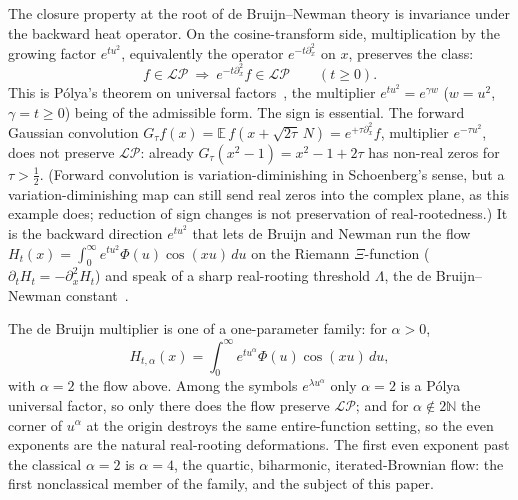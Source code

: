 \documentclass[11pt,reqno]{amsart}
\theoremstyle{plain}
\theoremstyle{definition}
\theoremstyle{remark}
\newcommand{\N}{\mathbb N}
\newcommand{\E}{\mathbb E}
\newcommand{\LP}{\mathcal{LP}}
\begin{document}
The closure property at the root of de Bruijn--Newman theory is invariance under
the backward heat operator. On the cosine-transform side, multiplication
by the growing factor $e^{tu^2}$, equivalently the operator $e^{-t\partial_x^2}$
on $x$, preserves the class:
\begin{equation}\label{eq:heatLP}
   f\in\LP\ \Longrightarrow\ e^{-t\partial_x^2}f\in\LP\qquad(t\ge0).
\end{equation}
This is P\'olya's theorem on universal factors~\cite{Polya13,Polya27,deBruijn},
the multiplier $e^{tu^2}=e^{\gamma w}$ ($w=u^2$, $\gamma=t\ge0$) being of the
admissible form. The sign is essential. The forward Gaussian convolution
$G_\tau f(x)=\E\,f(x+\sqrt{2\tau}\,N)=e^{+\tau\partial_x^2}f$, multiplier
$e^{-\tau u^2}$, does not preserve $\LP$: already
$G_\tau(x^2-1)=x^2-1+2\tau$ has non-real zeros for $\tau>\tfrac12$. (Forward
convolution is variation-diminishing in Schoenberg's sense, but a
variation-diminishing map can still send real zeros into the complex plane, as
this example does; reduction of sign changes is not preservation of
real-rootedness.) It is the backward direction $e^{tu^2}$ that lets de Bruijn and
Newman run the flow $H_t(x)=\int_0^\infty e^{tu^2}\Phi(u)\cos(xu)\,du$ on the
Riemann $\Xi$-function ($\partial_t H_t=-\partial_x^2H_t$) and speak of a
sharp real-rooting threshold $\Lambda$, the de Bruijn--Newman
constant~\cite{deBruijn,Newman,RodgersTao}.

The de Bruijn multiplier is one of a one-parameter family: for $\alpha>0$,
\begin{equation}\label{eq:family}
   H_{t,\alpha}(x)=\int_0^\infty e^{tu^\alpha}\Phi(u)\cos(xu)\,du,
\end{equation}
with $\alpha=2$ the flow above. Among the symbols $e^{\lambda u^\alpha}$ only
$\alpha=2$ is a P\'olya universal
factor, so only there does the flow preserve $\LP$; and for $\alpha\notin2\N$ the
corner of $u^\alpha$ at the origin destroys the same entire-function setting, so
the even exponents are the natural real-rooting deformations. The first even exponent past the classical
$\alpha=2$ is $\alpha=4$, the quartic, biharmonic, iterated-Brownian flow: the
first nonclassical member of the family, and the subject of this paper.
\end{document}
